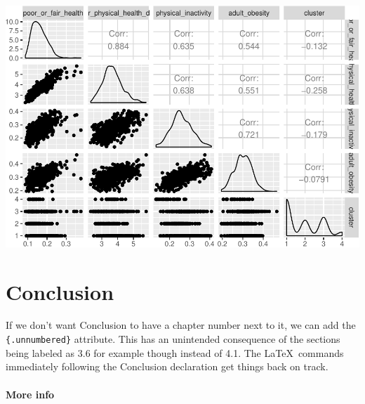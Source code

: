 \documentclass[12pt,twoside]{amherstthesis}
\begin{document}
  \begin{Shaded}
  \end{Shaded}
  
  \begin{center}\includegraphics{Comps_Proj_files/figure-latex/unnamed-chunk-10-1} \end{center}
  
  \chapter*{Conclusion}\label{conclusion}
  
  \setcounter{chapter}{4} \setcounter{section}{0}
  
  If we don't want Conclusion to have a chapter number next to it, we can
  add the \texttt{\{.unnumbered\}} attribute. This has an unintended
  consequence of the sections being labeled as 3.6 for example though
  instead of 4.1. The \LaTeX~commands immediately following the Conclusion
  declaration get things back on track.
  
  \subsubsection{More info}\label{more-info}
  
\end{document}
